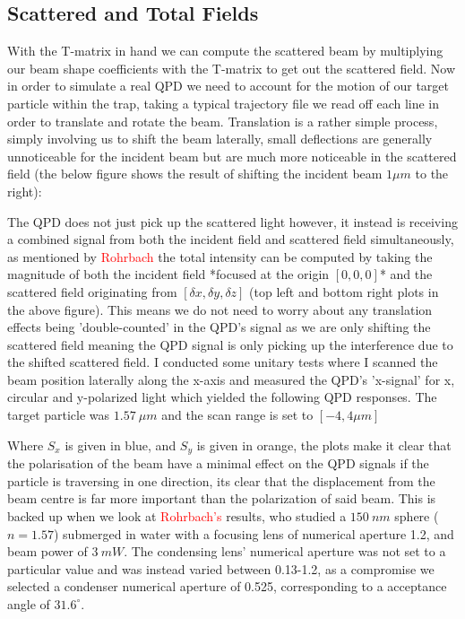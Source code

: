\subsection{Scattered and Total Fields}
With the T-matrix in hand we can compute the scattered beam by multiplying our beam shape coefficients with the T-matrix to get out the scattered field. Now in order to simulate a real QPD we need to account for the motion of our target particle within the trap, taking a typical trajectory file we read off each line in order to translate and rotate the beam. Translation is a rather simple process, simply involving us to shift the beam laterally, small deflections are generally unnoticeable for the incident beam but are much more noticeable in the scattered field (the below figure shows the result of shifting the incident beam $1\mu m$ to the right):

The QPD does not just pick up the scattered light however, it instead is receiving a combined signal from both the incident field and scattered field simultaneously, as mentioned by \textcolor{red}{Rohrbach} the total intensity can be computed by taking the magnitude of both the incident field *focused at the origin $[0,0,0]$* and the scattered field originating from $[\delta x, \delta y, \delta z]$ (top left and bottom right plots in the above figure). This means we do not need to worry about any translation effects being 'double-counted' in the QPD's signal as we are only shifting the scattered field meaning the QPD signal is only picking up the interference due to the shifted scattered field. I conducted some unitary tests where I scanned the beam position laterally along the x-axis and measured the QPD's 'x-signal' for x, circular and y-polarized light which yielded the following QPD responses. The target particle was $1.57\ \mu m$ and the scan range is set to $[-4, 4 \mu m]$

Where $S_x$ is given in blue, and $S_y$ is given in orange, the plots make it clear that the polarisation of the beam have a minimal effect on the QPD signals if the particle is traversing in one direction, its clear that the displacement from the beam centre is far more important than the polarization of said beam. This is backed up when we look at \textcolor{red}{Rohrbach's} results, who studied a $150\ nm$ sphere ($n=1.57$) submerged in water with a focusing lens of numerical aperture 1.2, and beam power of $3\ mW$. The condensing lens' numerical aperture was not set to a particular value and was instead varied between 0.13-1.2, as a compromise we selected a condenser numerical aperture of 0.525, corresponding to a acceptance angle of $31.6^\circ$. 

